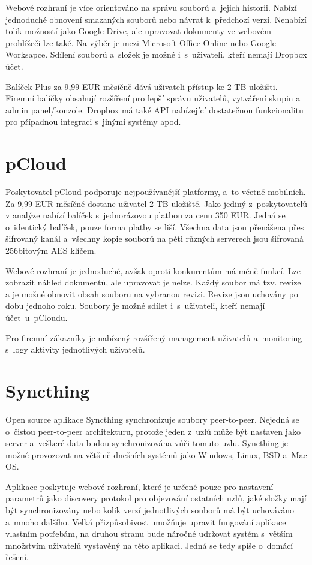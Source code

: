 Webové rozhraní je více orientováno na správu souborů a jejich historii. Nabízí jednoduché obnovení smazaných souborů nebo návrat k předchozí verzi.
Nenabízí tolik možností jako Google Drive, ale upravovat dokumenty ve webovém prohlížeči lze také. Na výběr je mezi Microsoft Office Online nebo Google Worksapce.
Sdílení souborů a složek je možné i s uživateli, kteří nemají Dropbox účet.

Balíček Plus za 9,99 EUR měsíčně dává uživateli přístup ke 2 TB uložišti. Firemní balíčky obsahují rozšíření pro lepší správu uživatelů, vytváření skupin
a admin panel/konzole. Dropbox má také API nabízející dostatečnou funkcionalitu pro případnou integraci s jinými systémy apod. \cite{Dropbox}

\section{pCloud}

Poskytovatel pCloud podporuje nejpoužívanější platformy, a to včetně mobilních. Za 9,99 EUR měsíčně dostane uživatel 2 TB uložiště. Jako jediný z poskytovatelů
v analýze nabízí balíček s jednorázovou platbou za cenu 350 EUR. Jedná se o identický balíček, pouze forma platby se liší. Všechna data jsou přenášena přes
šifrovaný kanál a všechny kopie souborů na pěti různých serverech jsou šifrovaná 256bitovým AES klíčem. \cite{pCloud}

Webové rozhraní je jednoduché, avšak oproti konkurentům má méně funkcí. Lze zobrazit náhled dokumentů, ale upravovat je nelze. Každý soubor má tzv. revize 
a je možné obnovit obsah souboru na vybranou revizi. Revize jsou uchovány po dobu jednoho roku. Soubory je možné sdílet i s uživateli, kteří nemají účet u pCloudu. 

Pro firemní zákazníky je nabízený rozšířený management uživatelů a monitoring s logy aktivity jednotlivých uživatelů.

\section{Syncthing}

Open source aplikace Syncthing synchronizuje soubory peer-to-peer. Nejedná se o čistou peer-to-peer architekturu, protože jeden z uzlů může být
nastaven jako server a veškeré data budou synchronizována vůči tomuto uzlu. Syncthing je možné provozovat na většině dnešních systémů jako Windows, Linux, BSD a Mac OS. \cite{Syncthing}

Aplikace poskytuje webové rozhraní, které je určené pouze pro nastavení parametrů jako discovery protokol pro objevování ostatních uzlů, jaké složky mají být synchronizovány
nebo kolik verzí jednotlivých souborů má být uchováváno a mnoho dalšího. Velká přizpůsobivost umožňuje upravit fungování aplikace vlastním potřebám, na druhou
stranu bude náročné udržovat systém s větším množstvím uživatelů vystavěný na této aplikaci. Jedná se tedy spíše o domácí řešení.

